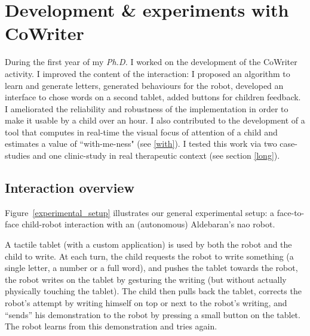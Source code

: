 \documentclass[10pt,a4paper]{article}
\begin{document}
\section{Development \& experiments with CoWriter}\label{year}
During the first year of my \textit{Ph.D.} I worked on the development of the CoWriter activity. 
I improved the content of the interaction: I proposed an algorithm to learn and generate letters, generated behaviours for the robot, developed an interface to chose words on a second tablet, added buttons for children feedback. 
I ameliorated the reliability and robustness of the implementation in order to make it usable by a child over an hour.
I also contributed to the development of a tool that computes in real-time the visual focus of attention of a child and estimates a value of ``with-me-ness" (see \ref{with}). 
I tested this work via two case-studies and one clinic-study in real therapeutic context (see section \ref{long}). 

\subsection{Interaction overview}
Figure~\ref{experimental_setup} illustrates our general experimental setup: a
face-to-face child-robot interaction with an (autonomous) Aldebaran's {\sc nao}
robot.

A tactile tablet (with a custom application) is used by both the robot and the
child to write. At each turn, the child requests the robot to write
something (a single letter, a number or a full word), and pushes the tablet
towards the robot, the robot writes on the tablet by gesturing the writing (but
without actually physically touching the tablet). The child then pulls back the
tablet, corrects the robot's attempt by writing himself on top or next to
the robot's writing, and ``sends'' his
demonstration to the robot by pressing a small button on the tablet. The robot
learns from this demonstration and tries again.
\end{document}
